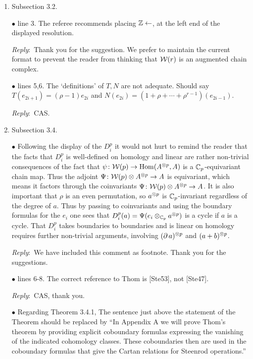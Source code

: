 \documentclass{amsart}
\newcommand{\ar}{\medskip\noindent\textit{Reply}:\ }
\def\subitem{\medskip\noindent$\bullet$ }
\begin{document}
\begin{enumerate}
	\item Subsection 3.2.

	\subitem line 3. The referee recommends placing $\mathbb{Z} \leftarrow$, at the left end of the displayed resolution.

	\ar Thank you for the suggestion.
	We prefer to maintain the current format to prevent the reader from thinking that $\mathcal{W}(r)$ is an augmented chain complex.

	\subitem lines 5,6. The ‘definitions’ of $T, N$ are not adequate.
	Should say $T(e_{2i+1}) = (\rho-1)e_{2i}$ and $N(e_{2i}) = (1 + \rho + \cdots + \rho^{r-1})(e_{2i-1})$.

	\ar CAS.

	\item Subsection 3.4.

	\subitem Following the display of the $D_i^p$ it would not hurt to remind the reader that the facts that $D_i^p$ is well-defined on homology and linear are rather non-trivial consequences of the fact that $\psi \colon \mathcal{W}(p) \to \mathrm{Hom}(A^{\otimes p}, A)$ is a $\mathbb{C}_p$-equivariant chain map.
	Thus the adjoint $\Psi \colon \mathcal{W}(p) \otimes A^{\otimes p} \to A$ is equivariant, which means it factors through the coinvariants $\Psi \colon \mathcal{W}(p) \otimes A^{\otimes p} \to A$.
	It is also important that $\rho$ is an even permutation, so	$a^{\otimes p}$ is ${\mathbb{C}_p}$-invariant regardless of the degree of $a$.
	Thus by passing to coinvariants and using the boundary formulas for the $e_i$ one sees that $D_i^p(a) = \Psi(e_i \otimes_{\mathbb{C}_p} a^{\otimes p})$ is a cycle if $a$ is a cycle.
	That $D_i^p$ takes boundaries to boundaries and is linear on homology requires further non-trivial arguments, involving $(\operatorname{\partial} a)^{\otimes p}$ and $(a + b)^{\otimes p}$.

	\ar We have included this comment as footnote. Thank you for the suggestions.

	\subitem lines 6-8. The correct reference to Thom is [Ste53], not [Ste47].

	\ar CAS, thank you.

	\subitem Regarding Theorem 3.4.1, The sentence just above the statement of the Theorem should be
	replaced by “In Appendix A we will prove Thom’s theorem by providing explicit coboundary formulas expressing the vanishing of the indicated cohomology classes.
	These coboundaries then are used in the coboundary formulas that give the Cartan relations for Steenrod
	operations.”

	\medskip{}


\end{enumerate}
\end{document}
